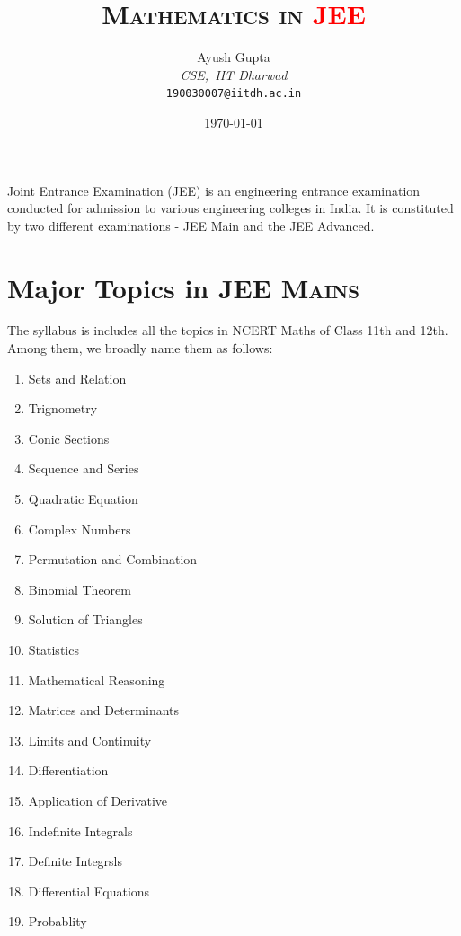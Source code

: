 \documentclass{article}
\begin{document}
	\tableofcontents
	\listoffigures
	\listoftables
	\title{\textbf{{\Huge \textsc{Mathematics in \textcolor{red}{JEE}}}}}
	\author{\colorbox[HTML]{1FE9EE}{Ayush Gupta} \\ \emph{CSE,~IIT Dharwad} \\ \texttt{190030007@iitdh.ac.in}}
	\date{\today}
	\maketitle
	
	Joint Entrance Examination (JEE) is an engineering entrance examination conducted for admission to various engineering colleges in India. It is constituted by two different examinations - JEE Main and the JEE Advanced.
	
	\section{Major Topics in JEE \scshape{Mains}}  \label{sec: syllabus}
	
	The syllabus is includes all the topics in NCERT Maths of Class 11th and 12th. Among them, we broadly name them as follows:
	
	\begin{enumerate}
		 \item Sets and Relation
		 \item Trignometry
         \item Conic Sections
         \item Sequence and Series
         \item Quadratic Equation
         \item Complex Numbers
         \item Permutation and Combination
         \item Binomial Theorem
         \item Solution of Triangles
         \item Statistics
         \item Mathematical Reasoning
         \item Matrices and Determinants
         \item Limits and Continuity
         \item Differentiation
         \item Application of Derivative
         \item Indefinite Integrals
         \item Definite Integrsls
         \item Differential Equations
         \item Probablity
	\end{enumerate}
	
\end{document}
